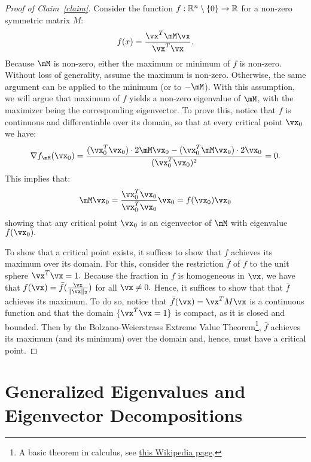 \begin{proof}[Proof of Claim~\ref{claim}]
Consider the function $f: \mathbb{R}^n \setminus\{0\}\to \mathbb{R}$ for a non-zero symmetric matrix $M$:
$$
f(x) = \frac{\vx^T \mM \vx}{\vx^T \vx}.
$$
Because $\mM$ is non-zero, either the maximum or minimum of $f$ is non-zero. Without loss of generality, assume the maximum is non-zero. Otherwise, the same argument can be applied to the minimum (or to $-\mM$).
With this assumption, we will argue that  maximum of $f$ yields a non-zero eigenvalue of $\mM$, with the maximizer being the corresponding eigenvector. To prove this, notice that $f$ is continuous and differentiable over its domain, so that at every critical point $\vx_0$ we have:
$$
\nabla f_\mM(\vx_0) = \frac{(\vx_0^T \vx_0) \cdot 2\mM \vx_0 - (\vx_0^T \mM \vx_0) \cdot 2\vx_0}{(\vx_0^T \vx_0)^2} = 0.
$$
This implies that:
$$
\mM \vx_0 = \frac{\vx_0^T \vx_0} {\vx_0^T \vx_0} \vx_0 = f(\vx_0) \vx_0
$$
showing that any critical point $\vx_0$ is an eigenvector of $\mM$ with eigenvalue $f(\vx_0).$

To show that a critical point exists, it suffices to show that $f$ achieves its maximum over its domain. For this, consider the restriction $\bar{f}$ of $f$ to the unit sphere $\vx^T\vx=1.$
Because the fraction in $f$ is homogeneous in $\vx$, we have that $f(\vx) = \bar{f}(\frac{\vx}{\|\vx\|_2})$ for all $\vx \neq 0.$ Hence, it suffices to show that that $\bar{f}$ achieves its maximum.
To do so, notice that $\bar{f}(\vx) = \vx^T M \vx$ is a continuous function and that the domain $\{\vx^T\vx = 1\}$ is compact, as it is closed and bounded. Then by the Bolzano-Weierstrass Extreme Value Theorem\footnote{A basic theorem in calculus, see \href{https://en.wikipedia.org/wiki/Extreme_value_theorem}{this Wikipedia page}.}, $\bar{f}$ achieves its maximum (and its minimum) over the domain and, hence, must have a critical point.
\end{proof}




\section{Generalized Eigenvalues and Eigenvector Decompositions}

